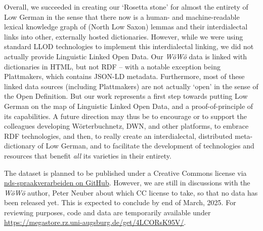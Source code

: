 Overall, we succeeded in creating our `Rosetta stone' for almost the entirety of Low German in the sense that there now is a human- and machine-readable lexical knowledge graph of (North Low Saxon) lemmas and their interdialectal links into other, externally hosted dictionaries.
However, while we were using standard LLOD technologies to implement this interdialectal linking, we did not actually provide Linguistic Linked Open Data. Our \emph{WöWö} data is linked with dictionaries in HTML, but not RDF -- with a notable exception being Plattmakers, which contains JSON-LD metadata. 
Furthermore, most of these linked data sources (including Plattmakers) are not actually `open' in the sense of the Open Definition. 
But our work represents a first step towards putting Low German on the map of Linguistic Linked Open Data, and a proof-of-principle of its capabilities.
A future direction may thus be to encourage or to support the colleagues developing Wörterbuchnetz, DWN, and other platforms, to embrace RDF technologies, and then, to really create an interdialectal, distributed meta-dictionary of Low German, and to facilitate the development of technologies and resources that benefit \emph{all} its varieties in their entirety.

The dataset is planned to be published under a Creative Commons license via \href{https://github.com/nds-spraakverarbeiden/}{nds-spraakverarbeiden on GitHub}. However, we are still in discussions with the \emph{WöWö} author, Peter Neuber about which CC license to take, so that no data has been released yet. This is expected to conclude by end of March, 2025. For reviewing purposes, code and data are temporarily available under \url{https://megastore.rz.uni-augsburg.de/get/4LCORsK95V/}.
